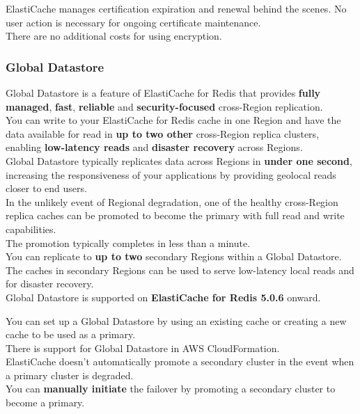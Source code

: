 \documentclass[12pt, letterpaper, twoside]{article}
\begin{document}
ElastiCache manages certification expiration and renewal behind the scenes. No user action is necessary for ongoing 
certificate maintenance.\\
There are no additional costs for using encryption.\\

\subsubsection{Global Datastore}
Global Datastore is a feature of ElastiCache for Redis that provides \textbf{fully managed}, \textbf{fast}, \textbf{
reliable} and \textbf{security-focused} cross-Region replication.\\
You can write to your ElastiCache for Redis cache in one Region and have the data available for read in \textbf{up to
two other} cross-Region replica clusters, enabling \textbf{low-latency reads} and \textbf{disaster recovery} across Regions.\\

Global Datastore typically replicates data across Regions in \textbf{under one second}, increasing the responsiveness of your 
applications by providing geolocal reads closer to end users.\\
In the unlikely event of Regional degradation, one of the healthy cross-Region replica caches can be promoted to become 
the primary with full read and write capabilities.\\
The promotion typically completes in less than a minute.\\

You can replicate to \textbf{up to two} secondary Regions within a Global Datastore. The caches in secondary Regions 
can be used to serve low-latency local reads and for disaster recovery.\\

Global Datastore is supported on \textbf{ElastiCache for Redis 5.0.6} onward.

You can set up a Global Datastore by using an existing cache or creating a new cache to be used as a primary.\\
There is support for Global Datastore in AWS CloudFormation.\\

ElastiCache doesn’t automatically promote a secondary cluster in the event when a primary cluster is degraded.\\
You can \textbf{manually initiate} the failover by promoting a secondary cluster to become a primary.\\
\end{document}
